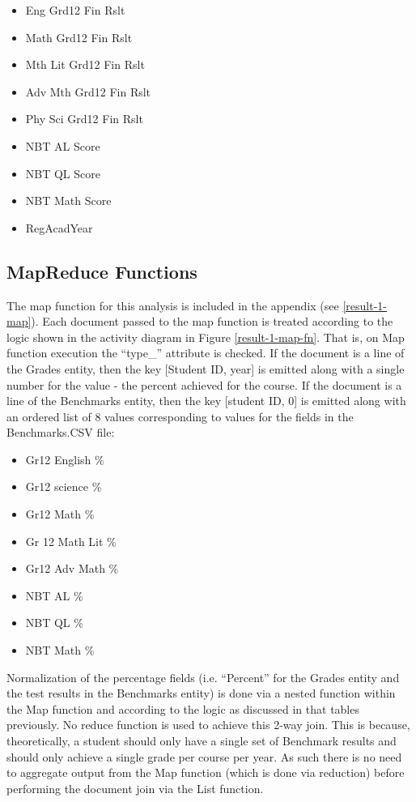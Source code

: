 \begin{enumerate}
\begin{itemize}
              \item Eng Grd12 Fin Rslt
              \item Math Grd12 Fin Rslt
              \item Mth Lit Grd12 Fin Rslt
              \item Adv Mth Grd12 Fin Rslt
              \item Phy Sci Grd12 Fin Rslt
              \item NBT AL Score
              \item NBT QL Score
              \item NBT Math Score
              \item RegAcadYear
          \end{itemize}
\end{enumerate}

\subsection{MapReduce Functions}
The map function for this analysis is included in the appendix (see \ref{result-1-map}). Each document passed to the map function is treated according to the logic shown in the activity diagram in Figure \ref{result-1-map-fn}. That is, on Map function execution the ``type\_'' attribute is checked. If the document is a line of the Grades entity, then the key [Student ID, year] is emitted along with a single number for the value - the percent achieved for the course. If the document is a line of the Benchmarks entity, then the key [student ID, 0] is emitted along with an ordered list of 8 values corresponding to values for the fields in the Benchmarks.CSV file:

\begin{itemize}
    \item Gr12 English \%
    \item Gr12 science \%
    \item Gr12 Math \%
    \item Gr 12 Math Lit \%
    \item Gr12 Adv Math \%
    \item NBT AL \%
    \item NBT QL \%
    \item NBT Math \%
\end{itemize}

Normalization of the percentage fields (i.e. ``Percent'' for the Grades entity and the test results in the Benchmarks entity) is done via a nested function within the Map function and according to the logic as discussed in that tables previously. No reduce function is used to achieve this 2-way join. This is because, theoretically, a student should only have a single set of Benchmark results and should only achieve a single grade per course per year. As such there is no need to aggregate output from the Map function (which is done via reduction) before performing the document join via the List function.

